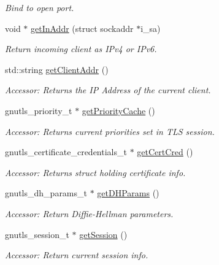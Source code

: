 \begin{DoxyCompactItemize}
\begin{DoxyCompactList}\small\item\em Bind to open port. \end{DoxyCompactList}\item 
void $\ast$ \hyperlink{classGTBCommunication_a7d2a3e93ca5ba8a880fea467d2d8b325}{get\-In\-Addr} (struct sockaddr $\ast$i\-\_\-sa)
\begin{DoxyCompactList}\small\item\em Return incoming client as I\-Pv4 or I\-Pv6. \end{DoxyCompactList}\item 
std\-::string \hyperlink{classGTBCommunication_a0767f8f014450f4ba30d6be2db74086a}{get\-Client\-Addr} ()
\begin{DoxyCompactList}\small\item\em Accessor\-: Returns the I\-P Address of the current client. \end{DoxyCompactList}\item 
gnutls\-\_\-priority\-\_\-t $\ast$ \hyperlink{classGTBCommunication_ac40042c1dd24bb71f730eae70c0dfc06}{get\-Priority\-Cache} ()
\begin{DoxyCompactList}\small\item\em Accessor\-: Returns current priorities set in T\-L\-S session. \end{DoxyCompactList}\item 
gnutls\-\_\-certificate\-\_\-credentials\-\_\-t $\ast$ \hyperlink{classGTBCommunication_aaff60196d8623e94588a9efb1593fa7e}{get\-Cert\-Cred} ()
\begin{DoxyCompactList}\small\item\em Accessor\-: Returns struct holding certificate info. \end{DoxyCompactList}\item 
gnutls\-\_\-dh\-\_\-params\-\_\-t $\ast$ \hyperlink{classGTBCommunication_a73df04ac0442aabd5a1919d6e95501e8}{get\-D\-H\-Params} ()
\begin{DoxyCompactList}\small\item\em Accessor\-: Return Diffie-\/\-Hellman parameters. \end{DoxyCompactList}\item 
gnutls\-\_\-session\-\_\-t $\ast$ \hyperlink{classGTBCommunication_a762b0f4bb1e3f27c01e1ce4b2f3aca65}{get\-Session} ()
\begin{DoxyCompactList}\small\item\em Accessor\-: Return current session info. \end{DoxyCompactList}\item 

\end{DoxyCompactItemize}
